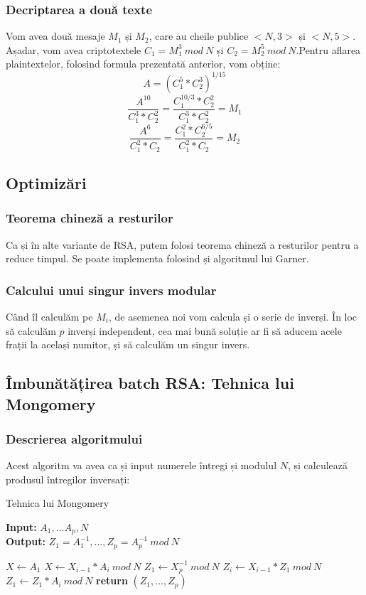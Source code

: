 \documentclass[12]{report}
\begin{document}
		  \subsubsection{Decriptarea a două texte}
		  Vom avea două mesaje $M_1$ și $M_2$, care au cheile publice $<N,3>$ și $<N,5>$. Așadar, vom avea criptotextele $C_1 = M_{1}^{3} \ mod \ N$ și $C_2 = M_{2}^{5} \ mod \ N$.Pentru aflarea plaintextelor, folosind formula prezentată anterior, vom obține:
		  $$ A=(C_{1}^{5} * C_{2}^{3})^{1/15} $$
		  $$\frac{A^{10}}{C_{1}^{3} * C_{2}^{2}} = \frac{C_{1}^{10/3} * C_{2}^{2}}{C_{1}^{3} * C_{2}^{2} }=M_1$$
		  $$\frac{A^6}{C_{1}^{2} *C_{2}}=\frac{C_{1}^{2} *C_{2}^{6/5}}{C_{1}^{2} * C_{2}}=M_2 $$
		  
		  \subsection{Optimizări}
		  \subsubsection{Teorema chineză a resturilor}
		  Ca și în alte variante de RSA, putem folosi teorema chineză a resturilor pentru a reduce timpul. Se poate implementa folosind și algoritmul lui Garner.
		  \subsubsection{Calcului unui singur invers modular}
		  Când îl calculăm pe $M_i$, de asemenea noi vom calcula și o serie de inverși. În loc să calculăm $p$ inverși independent, cea mai bună soluție ar fi să aducem acele frații la același numitor, și să calculăm un singur invers.
		  \subsection{Îmbunătățirea batch RSA: Tehnica lui Mongomery}
		
		
		
		
		
		
		  \subsubsection{Descrierea algoritmului}
		  Acest algoritm va avea ca și input numerele întregi și modulul $N$, și calculează produsul întregilor inversați:  
		  \begin{algorithm}[H]
		   \caption{Tehnica lui Mongomery}
		   \textbf{Input:} $A_1,...A_p,N$ \\
		   \textbf{Output:} $Z_1=A_{1}^{-1},...,Z_p=A_{p}^{-1} \ mod \ N$
		   \begin{algorithmic}
		   	\State $X \gets A_1$
		   	\State $X \gets X_{i-1}*A_i \ mod \ N$
		   	\EndFor
		   	\State $Z_1 \gets X_{p}^{-1} \ mod \ N$
		   		\State $Z_i \gets X_{i-1} * Z_1 \ mod \ N$
		   		\State $Z_1 \gets Z_1 * A_i \ mod \ N$
		   		\State
		   	\EndFor
		   	\State \textbf{return} $(Z_1,...,Z_p)$ 
		   \end{algorithmic}
		   \end{algorithm}
		   
\end{document}

